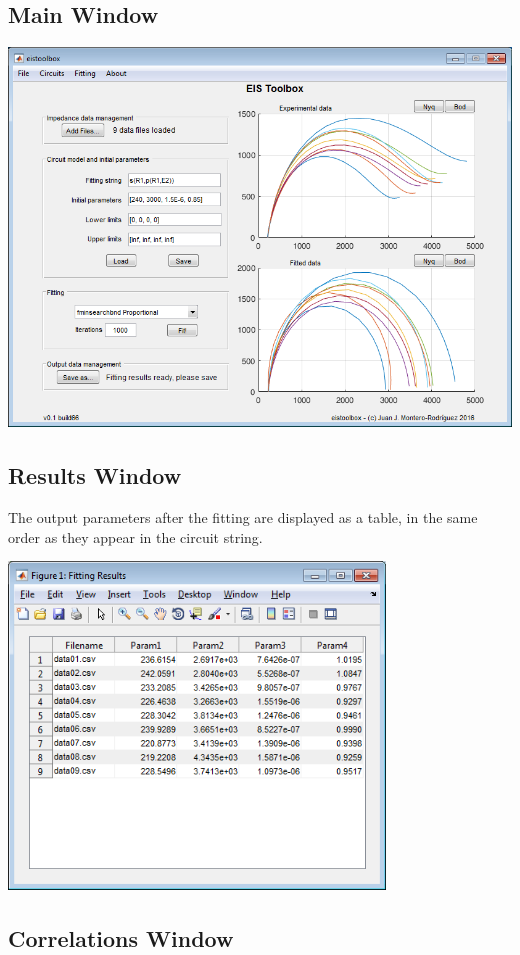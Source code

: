 \documentclass[10pt,a4paper,oneside]{book}
\begin{document}
\subsection{Main Window}

\includegraphics[width=15cm]{main_screenshot.png}

\subsection{Results Window}

The output parameters after the fitting are displayed as a table, in the same order as they appear in the circuit string.

\includegraphics[width=10cm]{scr_results.png}

\subsection{Correlations Window}
\end{document}
